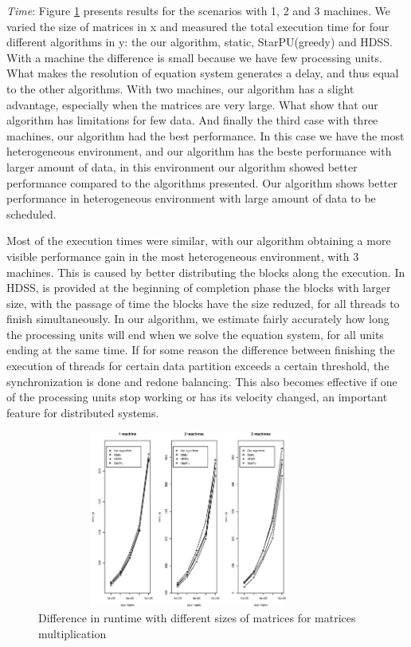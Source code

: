 \documentclass[journal]{IEEEtran}
\begin{document}
\textit{Time}: Figure \ref{fig:todosJuntos} presents results for the scenarios
with 1, 2 and 3 machines. We varied the size of matrices in x and measured the total
execution time for four different algorithms in y: the our algorithm, static,
StarPU(greedy) and HDSS. With a machine the difference is small because we have few processing units. What makes the resolution of equation system generates a delay, and thus equal to the other algorithms. With two machines, our algorithm has a slight advantage, especially when the matrices are very large. What show that our algorithm has limitations for few data. And finally the third case with three machines, our algorithm had the best performance. In this case we have the most heterogeneous environment, and our algorithm has the beste performance with larger amount of data, in this environment our algorithm showed better performance compared to the algorithms presented. Our algorithm shows better performance in heterogeneous environment with large amount of data to be scheduled.

Most of the execution times were similar, with our algorithm obtaining a more
visible performance gain in the most heterogeneous environment, with 3
machines. This is caused by better distributing the blocks along the execution. In HDSS, is provided at the beginning of completion phase the blocks with larger size, with the passage of time the blocks have the size reduzed, for all threads to finish simultaneously. In our algorithm, we estimate fairly accurately how long the processing units will end when we solve the equation system, for all units ending at the same time. If for some reason the difference between finishing the execution of threads for certain data partition exceeds a certain threshold, the synchronization is done and redone balancing. This also becomes effective if one of the processing units stop working or has its velocity changed, an important feature for distributed systems. 

\begin{figure}[htb]
	\begin{center}
	\centering
			\includegraphics[width=10cm,height=5.8cm]{MaquinasMatrix.eps}
	\caption{Difference in runtime with different sizes of matrices for matrices multiplication}
	\label{fig:todosJuntos}
	\end{center}
\end{figure}
\end{document}
